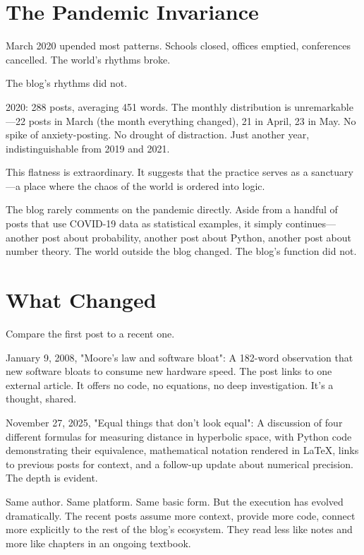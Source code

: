 \bigskip

\section*{The Pandemic Invariance}

March 2020 upended most patterns. Schools closed, offices emptied, conferences cancelled. The world's rhythms broke.

The blog's rhythms did not.

2020: 288 posts, averaging 451 words. The monthly distribution is unremarkable—22 posts in March (the month everything changed), 21 in April, 23 in May. No spike of anxiety-posting. No drought of distraction. Just another year, indistinguishable from 2019 and 2021.

This flatness is extraordinary. It suggests that the practice serves as a sanctuary—a place where the chaos of the world is ordered into logic.

The blog rarely comments on the pandemic directly. Aside from a handful of posts that use COVID-19 data as statistical examples, it simply continues—another post about probability, another post about Python, another post about number theory. The world outside the blog changed. The blog's function did not.

\bigskip

\section*{What Changed}

Compare the first post to a recent one.

January 9, 2008, "Moore's law and software bloat": A 182-word observation that new software bloats to consume new hardware speed. The post links to one external article. It offers no code, no equations, no deep investigation. It's a thought, shared.

November 27, 2025, "Equal things that don't look equal": A discussion of four different formulas for measuring distance in hyperbolic space, with Python code demonstrating their equivalence, mathematical notation rendered in LaTeX, links to previous posts for context, and a follow-up update about numerical precision. The depth is evident.

Same author. Same platform. Same basic form. But the execution has evolved dramatically. The recent posts assume more context, provide more code, connect more explicitly to the rest of the blog's ecosystem. They read less like notes and more like chapters in an ongoing textbook.

